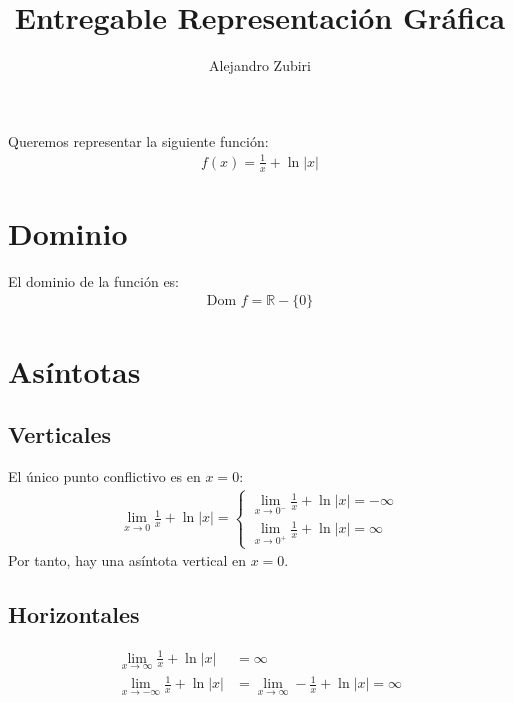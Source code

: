 \documentclass{article}
\title{Entregable Representación Gráfica}
\author{Alejandro Zubiri}
\begin{document}
\maketitle
\tableofcontents
\pagebreak
Queremos representar la siguiente función:
\begin{equation}
	\begin{split}
		f(x) = \frac{1}{x} + \ln |x|
	\end{split}
\end{equation}
\section{Dominio}
El dominio de la función es:
\begin{equation}
	\begin{split}
				\text{Dom }f = \mathbb{R}- \{ 0 \} 
	\end{split}
\end{equation}
\section{Asíntotas}
\subsection{Verticales}
El único punto conflictivo es en \(x=0\):
\begin{equation}
	\begin{split}
		\lim_{x \to 0} \frac{1}{x} + \ln |x| = 
		 \left\{\begin{matrix}
\lim_{x \to 0^{-}} \frac{1}{x}+ \ln |x|= -\infty \\
\lim_{x \to 0^{+}} \frac{1}{x} + \ln |x| = \infty 
\end{matrix}\right.
	\end{split}
\end{equation}
Por tanto, hay una asíntota vertical en \(x=0\).
\subsection{Horizontales}
\begin{equation}
	\begin{split}
		\lim_{x \to \infty} \frac{1}{x}+ \ln |x|&= \infty\\
		\lim_{x \to -\infty} \frac{1}{x}+ \ln |x| &= \lim_{x \to \infty} - \frac{1}{x} + \ln |x|
		=\infty  
	\end{split}
\end{equation}
\end{document}
